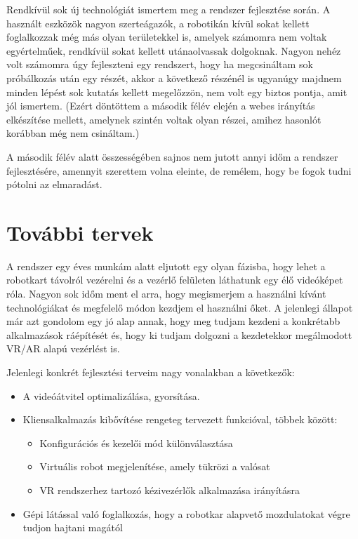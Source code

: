 \documentclass[11pt,a4paper,oneside]{article}
\begin{document}
Rendkívül sok új technológiát ismertem meg a rendszer fejlesztése során. A használt eszközök nagyon szerteágazók, a robotikán kívül sokat kellett foglalkozzak még más olyan területekkel is, amelyek számomra nem voltak egyértelműek, rendkívül sokat kellett utánaolvassak dolgoknak. Nagyon nehéz volt számomra úgy fejleszteni egy rendszert, hogy ha megcsináltam sok próbálkozás után egy részét, akkor a következő részénél is ugyanúgy majdnem minden lépést sok kutatás kellett megelőzzön, nem volt egy biztos pontja, amit jól ismertem. (Ezért döntöttem a második félév elején a webes irányítás elkészítése mellett, amelynek szintén voltak olyan részei, amihez hasonlót korábban még nem csináltam.)

A második félév alatt összességében sajnos nem jutott annyi időm a rendszer fejlesztésére, amennyit szerettem volna eleinte, de remélem, hogy be fogok tudni pótolni az elmaradást.

\newpage
\section{További tervek}

A rendszer egy éves munkám alatt eljutott egy olyan fázisba, hogy lehet a robotkart távolról vezérelni és a vezérlő felületen láthatunk egy élő videóképet róla. Nagyon sok időm ment el arra, hogy megismerjem a használni kívánt technológiákat és megfelelő módon kezdjem el használni őket. A jelenlegi állapot már azt gondolom egy jó alap annak, hogy meg tudjam kezdeni a konkrétabb alkalmazások ráépítését és, hogy ki tudjam dolgozni a kezdetekkor megálmodott VR/AR alapú vezérlést is.

Jelenlegi konkrét fejlesztési terveim nagy vonalakban a következők:
\begin{itemize}
  \item A videóátvitel optimalizálása, gyorsítása.
  \item Kliensalkalmazás kibővítése rengeteg tervezett funkcióval, többek között:
  \begin{itemize}
    \item Konfigurációs és kezelői mód különválasztása
    \item Virtuális robot megjelenítése, amely tükrözi a valósat
    \item VR rendszerhez tartozó kézivezérlők alkalmazása irányításra
  \end{itemize}
  \item Gépi látással való foglalkozás, hogy a robotkar alapvető mozdulatokat végre tudjon hajtani magától
\end{itemize}
\end{document}
